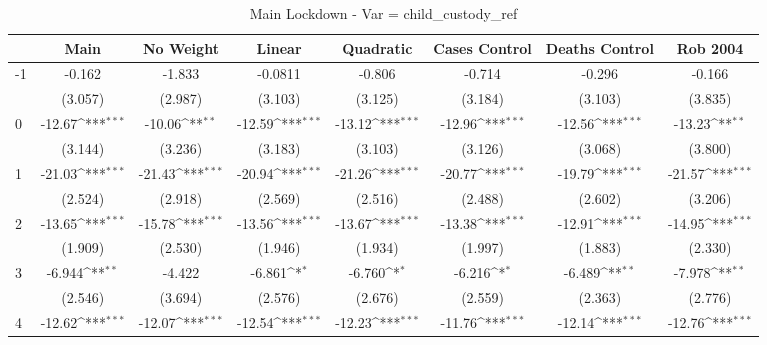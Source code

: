 \documentclass{article}
\begin{document}
{
\def\sym#1{\ifmmode^{#1}\else\(^{#1}\)\fi}
\begin{longtable}{l*{7}{c}}
\caption{Main Lockdown - Var = child\_custody\_ref}\\
\hline\hline\endfirsthead\hline\endhead\hline\endfoot\endlastfoot
                &\multicolumn{1}{c}{Main}&\multicolumn{1}{c}{No Weight}&\multicolumn{1}{c}{Linear}&\multicolumn{1}{c}{Quadratic}&\multicolumn{1}{c}{Cases Control}&\multicolumn{1}{c}{Deaths Control}&\multicolumn{1}{c}{Rob 2004}\\
\hline
-1              &   -0.162         &   -1.833         &  -0.0811         &   -0.806         &   -0.714         &   -0.296         &   -0.166         \\
                &  (3.057)         &  (2.987)         &  (3.103)         &  (3.125)         &  (3.184)         &  (3.103)         &  (3.835)         \\
0               &   -12.67\sym{***}&   -10.06\sym{**} &   -12.59\sym{***}&   -13.12\sym{***}&   -12.96\sym{***}&   -12.56\sym{***}&   -13.23\sym{**} \\
                &  (3.144)         &  (3.236)         &  (3.183)         &  (3.103)         &  (3.126)         &  (3.068)         &  (3.800)         \\
1               &   -21.03\sym{***}&   -21.43\sym{***}&   -20.94\sym{***}&   -21.26\sym{***}&   -20.77\sym{***}&   -19.79\sym{***}&   -21.57\sym{***}\\
                &  (2.524)         &  (2.918)         &  (2.569)         &  (2.516)         &  (2.488)         &  (2.602)         &  (3.206)         \\
2               &   -13.65\sym{***}&   -15.78\sym{***}&   -13.56\sym{***}&   -13.67\sym{***}&   -13.38\sym{***}&   -12.91\sym{***}&   -14.95\sym{***}\\
                &  (1.909)         &  (2.530)         &  (1.946)         &  (1.934)         &  (1.997)         &  (1.883)         &  (2.330)         \\
3               &   -6.944\sym{**} &   -4.422         &   -6.861\sym{*}  &   -6.760\sym{*}  &   -6.216\sym{*}  &   -6.489\sym{**} &   -7.978\sym{**} \\
                &  (2.546)         &  (3.694)         &  (2.576)         &  (2.676)         &  (2.559)         &  (2.363)         &  (2.776)         \\
4               &   -12.62\sym{***}&   -12.07\sym{***}&   -12.54\sym{***}&   -12.23\sym{***}&   -11.76\sym{***}&   -12.14\sym{***}&   -12.76\sym{***}\\

\end{longtable}}
\end{document}
